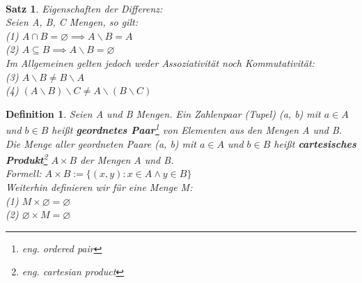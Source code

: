\documentclass[12pt,german,a4]{article}
\begin{document}
\\

\newtheorem{satz4}[satz]{Satz}
\begin{satz4}
Eigenschaften der Differenz:\\
Seien A, B, C Mengen, so gilt:\\
(1) $A \cap B = \varnothing \implies A \backslash B = A$\\
(2) $A \subseteq B \implies A \backslash B = \varnothing$\\
Im Allgemeinen gelten jedoch weder Assoziativität noch Kommutativität:\\
(3) $A \backslash B \neq B \backslash A$\\
(4) $(A \backslash B) \backslash C \neq A \backslash (B \backslash C)$
\end{satz4}

\newtheorem{defCartProduct}[defSet]{Definition}
\begin{defCartProduct}
Seien A und B Mengen. Ein Zahlenpaar (Tupel) (a, b) mit $a \in A$ und $b \in B$ heißt {\bf geordnetes Paar}\footnote{eng. ordered pair} von Elementen aus den Mengen A und B.\\

Die Menge aller geordneten Paare (a, b) mit $a \in A$ und $b \in B$  heißt {\bf cartesisches Produkt}\footnote{eng. cartesian product} $A \times B$ der Mengen A und B.\\
Formell: $A \times B := \{(x, y): x \in A \wedge y \in B\}$\\

Weiterhin definieren wir für eine Menge M:\\
(1) $M \times \varnothing = \varnothing$\\
(2) $\varnothing \times M = \varnothing$
\end{defCartProduct}
\end{document}
